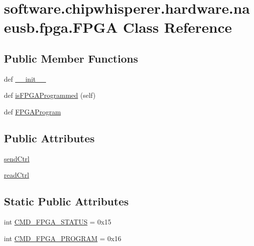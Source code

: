 \hypertarget{classsoftware_1_1chipwhisperer_1_1hardware_1_1naeusb_1_1fpga_1_1FPGA}{}\section{software.\+chipwhisperer.\+hardware.\+naeusb.\+fpga.\+F\+P\+G\+A Class Reference}
\label{classsoftware_1_1chipwhisperer_1_1hardware_1_1naeusb_1_1fpga_1_1FPGA}
\subsection*{Public Member Functions}
\begin{DoxyCompactItemize}
\item 
def \hyperlink{classsoftware_1_1chipwhisperer_1_1hardware_1_1naeusb_1_1fpga_1_1FPGA_ac01e01435e62c59e6cf663f268250841}{\+\_\+\+\_\+init\+\_\+\+\_\+}
\item 
def \hyperlink{classsoftware_1_1chipwhisperer_1_1hardware_1_1naeusb_1_1fpga_1_1FPGA_a362fcaeea905ecfb91fbe56e36d29c7a}{is\+F\+P\+G\+A\+Programmed} (self)
\item 
def \hyperlink{classsoftware_1_1chipwhisperer_1_1hardware_1_1naeusb_1_1fpga_1_1FPGA_ae74c1a11050e1ddf3dad7f7557592334}{F\+P\+G\+A\+Program}
\end{DoxyCompactItemize}
\subsection*{Public Attributes}
\begin{DoxyCompactItemize}
\item 
\hyperlink{classsoftware_1_1chipwhisperer_1_1hardware_1_1naeusb_1_1fpga_1_1FPGA_a18dce2e9b27a4e1dbafe37295bc7ba87}{send\+Ctrl}
\item 
\hyperlink{classsoftware_1_1chipwhisperer_1_1hardware_1_1naeusb_1_1fpga_1_1FPGA_a2ab1f3bccc19ecf43b8f96907a0c88e5}{read\+Ctrl}
\end{DoxyCompactItemize}
\subsection*{Static Public Attributes}
\begin{DoxyCompactItemize}
\item 
int \hyperlink{classsoftware_1_1chipwhisperer_1_1hardware_1_1naeusb_1_1fpga_1_1FPGA_a7105627c474f731b7edae3397726cca6}{C\+M\+D\+\_\+\+F\+P\+G\+A\+\_\+\+S\+T\+A\+T\+U\+S} = 0x15
\item 
int \hyperlink{classsoftware_1_1chipwhisperer_1_1hardware_1_1naeusb_1_1fpga_1_1FPGA_a611615e3ac2381fd6e320ee4910d7f36}{C\+M\+D\+\_\+\+F\+P\+G\+A\+\_\+\+P\+R\+O\+G\+R\+A\+M} = 0x16
\end{DoxyCompactItemize}



